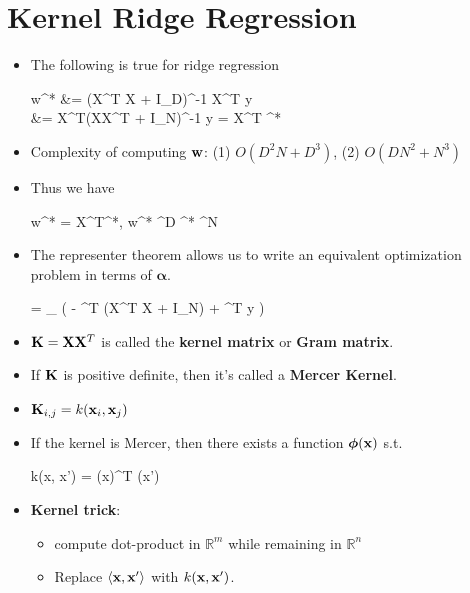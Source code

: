 
\section{Kernel Ridge Regression}
\begin{itemize}
	\item The following is true for ridge regression
	\begin{myalign*}
	    \* w^* &= (\*X^T \*X + \lambda \*I_D)^{-1} \*X^T \*y \\
	    &= \*X^T(\*X\*X^T + \lambda \*I_N)^{-1} \*y = \*X^T \bm \alpha^* 
	\end{myalign*}
	\item Complexity of computing $\mathbf{w}$: (1) $O(D^2 N + D^3)$, (2) $O(D N^2 + N^3)$
	\item Thus we have
	\begin{myalign*}
	     \*w^* = \*X^T\bm \alpha^*, \quad {} \* w^* \in \R^D  \bm \alpha^* \in \R^N
	\end{myalign*}
	\item The representer theorem allows us to write an equivalent optimization problem in terms of $\bm \alpha$.
	\begin{myalign*}
	    \bm \alpha = \argmax_{\bm \alpha} 
	    \left(
	    - \bm \alpha^T (\*X^T \*X + \lambda \*I_N) \bm \alpha + \bm \alpha^T \*y 
	    \right)
	\end{myalign*}
	\item $\mathbf{K} = \mathbf{X} \mathbf{X}^T$ is called the \textbf{kernel matrix} or \textbf{Gram matrix}.
	\item If $\mathbf{K}$ is positive definite, then it's called a \textbf{Mercer Kernel}.
	\item $\mathbf{K}_{i,j} = k(\mathbf{x}_i, \mathbf{x}_j)$
	\item If the kernel is Mercer, then there exists a function $\bm \phi(\mathbf{x})$ s.t.
	\begin{myalign*}
	    k(\*x, \*x') = \bm \phi(\*x)^T \bm \phi(\*x')
	\end{myalign*}
	\item \textbf{Kernel trick}: 
	\begin{itemize}
		\item compute dot-product in $\mathbb{R}^m$ while remaining in $\mathbb{R}^n$
		\item Replace $\langle \mathbf{x}, \mathbf{x}' \rangle$ with $k(\mathbf{x}, \mathbf{x}')$.
	\end{itemize}
	

\end{itemize}
